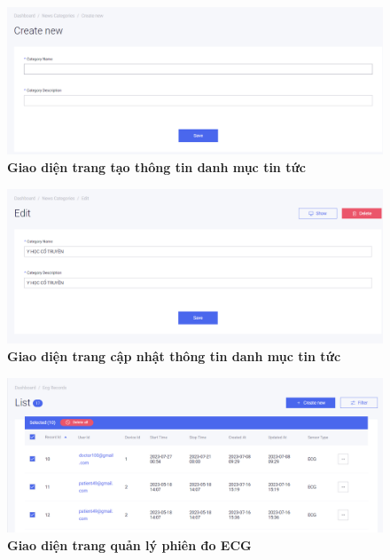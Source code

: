 \begin{figure}[H]
  \centering
  \includegraphics[scale=0.5]{Images/server/webUI/news_category_create.PNG}
  \caption[Giao diện trang tạo thông tin danh mục tin tức]{\bfseries \fontsize{12pt}{0pt}\selectfont Giao diện trang tạo thông tin danh mục tin tức}
  \label{news_category_create} %
\end{figure}

\begin{figure}[H]
  \centering
  \includegraphics[scale=0.5]{Images/server/webUI/news_category_edit.PNG}
  \caption[Giao diện trang cập nhật thông tin danh mục tin tức]{\bfseries \fontsize{12pt}{0pt}\selectfont Giao diện trang cập nhật thông tin danh mục tin tức}
  \label{news_category_edit} %
\end{figure}


\begin{figure}[H]
  \centering
  \includegraphics[scale=0.5]{Images/server/webUI/ecg_record_list.PNG}
  \caption[Giao diện trang quản lý phiên đo ECG]{\bfseries \fontsize{12pt}{0pt}\selectfont Giao diện trang quản lý phiên đo ECG}
  \label{ecg_record_list} %
\end{figure}

